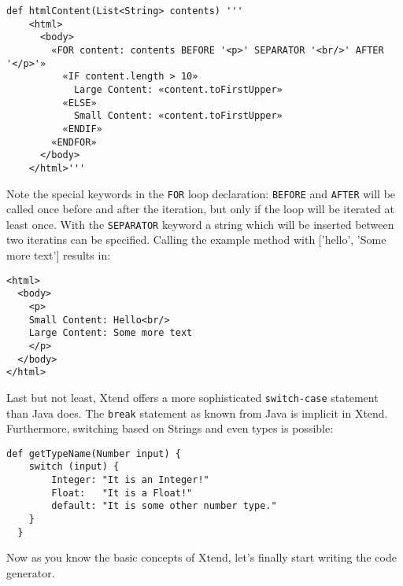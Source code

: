 \begin{lstlisting}[language=Xtend]
  def htmlContent(List<String> contents) '''
  	<html>
  	  <body>
  	    «FOR content: contents BEFORE '<p>' SEPARATOR '<br/>' AFTER '</p>'»
  	      «IF content.length > 10»
  	        Large Content: «content.toFirstUpper»
  	      «ELSE»
  	        Small Content: «content.toFirstUpper»
  	      «ENDIF»
  	    «ENDFOR»
  	  </body>
  	</html>'''
\end{lstlisting}

Note the special keywords in the \texttt{FOR} loop declaration: \texttt{BEFORE} 
and \texttt{AFTER} will be called once before and after the iteration, but only
if the loop will be iterated at least once. With the \texttt{SEPARATOR} keyword
a string which will be inserted between two iteratins can be specified. Calling 
the example method with ['hello', 'Some more text'] results in:

\begin{lstlisting}[language=Xtend]
<html>
  <body>
    <p>
    Small Content: Hello<br/>
    Large Content: Some more text
    </p>
  </body>
</html>
\end{lstlisting}

Last but not least, Xtend offers a more sophisticated \texttt{switch-case} statement
than Java does. The \texttt{break} statement as known from Java is implicit in Xtend.
Furthermore, switching based on Strings and even types is possible:

\begin{lstlisting}[language=Xtend]
  def getTypeName(Number input) {
  	switch (input) {
  		Integer: "It is an Integer!"
  		Float:   "It is a Float!"
  		default: "It is some other number type."
  	}
  }
\end{lstlisting}

Now as you know the basic concepts of Xtend, let's finally start writing the code
generator.

